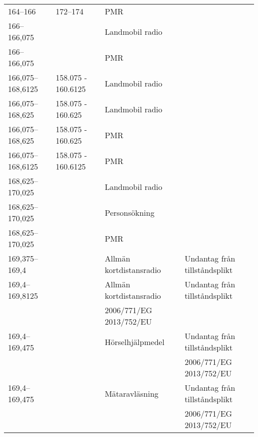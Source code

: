 \begin{landscape}
\begin{longtable}{llll}
	164--166                               & 172--174           & PMR                                   &  \\
	166--166,075                           &                    & Landmobil radio                       &  \\
	166--166,075                           &                    & PMR                                   &  \\
	166,075--168,6125                      & 158.075 - 160.6125 & Landmobil radio                       &  \\
	166,075--168,625                       & 158.075 - 160.625  & Landmobil radio                       &  \\
	166,075--168,625                       & 158.075 - 160.625  & PMR                                   &  \\
	166,075--168,6125                      & 158.075 - 160.6125 & PMR                                   &  \\
	168,625--170,025                       &                    & Landmobil radio                       &  \\
	168,625--170,025                       &                    & Personsökning                         &  \\
	168,625--170,025                       &                    & PMR                                   &  \\
	169,375--169,4                         &                    & Allmän kortdistansradio               & Undantag från tillståndsplikt  \\
	169,4--169,8125                        &                    & Allmän kortdistansradio               & Undantag från tillståndsplikt  \\
	                                       &                    & 2006/771/EG 2013/752/EU               &  \\
	169,4--169,475                         &                    & Hörselhjälpmedel                      & Undantag från tillståndsplikt  \\
	                                       &                    &                                       & 2006/771/EG 2013/752/EU        \\
	169,4--169,475                         &                    & Mätaravläsning                        & Undantag från tillståndsplikt  \\
	                                       &                    &                                       & 2006/771/EG 2013/752/EU        \\

\end{longtable}
\end{landscape}
